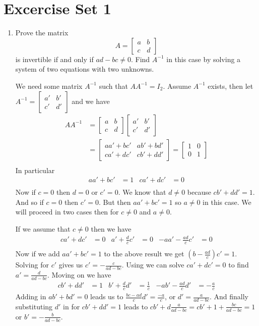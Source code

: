 \documentclass[letterpaper]{article}
\begin{document}
\section*{Excercise Set 1}
\begin{enumerate}
\item
Prove the matrix
\[A=\left[\begin{array}{cc}a&b\\c&d\end{array}\right]\]
is invertible if and only if $ad-bc\ne 0$. Find $A^{-1}$ in this case by solving a system of two equations with two unknowns.

We need some matrix $A^{-1}$ such that $AA^{-1}=I_2$.
Assume $A^{-1}$ exists, then let $A^{-1}=\left[\begin{array}{cc}a'&b'\\c'&d'\end{array}\right]$ and we have
\begin{align*}
  AA^{-1}&= \left[\begin{array}{cc}a&b\\c&d\end{array}\right]
            \left[\begin{array}{cc}a'&b'\\c'&d'\end{array}\right]\\
  &=\left[\begin{array}{cc}aa'+bc'&ab'+bd'\\ca'+dc'&cb'+dd'\end{array}\right]
  =\left[\begin{array}{cc}1&0\\0&1\end{array}\right]\\
\end{align*}
In particular
\begin{align*}
  aa'+bc'&=1&
  ca'+dc'&=0\\
\end{align*}
Now if $c=0$ then $d=0$ or $c'=0$. We know that $d\ne 0$ because $cb'+dd'=1$. And so if $c=0$ then $c'=0$. But then $aa'+bc'=1$ so $a\ne 0$ in this case. We will proceed in two cases then for $c\ne 0$ and $a\ne 0$.

If we assume that $c\ne 0$ then we have
\begin{align*}
  ca'+dc'&=0&
  a'+\frac{d}{c}c'&=0&
  -aa'-\frac{ad}{c}c'&=0\\
\end{align*}
Now if we add $aa'+bc'=1$ to the above result we get $\left(b-\frac{ad}{c}\right)c'=1$. Solving for $c'$ gives us $c'=-\frac{c}{ad-bc}$. Using we can solve $ca'+dc'=0$ to find $a'=\frac{d}{ad-bc}$. Moving on we have
\begin{align*}
  cb'+dd'&=1&b'+\frac{d}{c}d'&=\frac{1}{c}&-ab'-\frac{ad}{c}d'&=-\frac{a}{c}
\end{align*}
Adding in $ab'+bd'=0$ leads us to $\frac{bc-ad}{c}d'=\frac{-a}{c}$, or $d'=\frac{a}{ad-bc}$. And finally substituting $d'$ in for $cb'+dd'=1$ leads to $cb'+d\frac{a}{ad-bc}=cb'+1+\frac{bc}{ad-bc}=1$ or $b'=-\frac{b}{ad-bc}$.


\end{enumerate}
\end{document}
